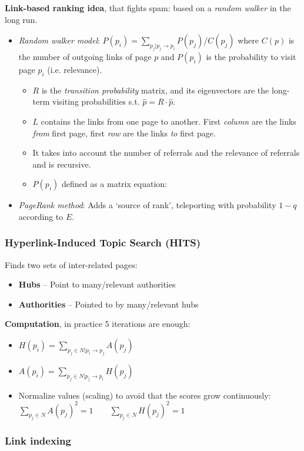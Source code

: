   \textbf{Link-based ranking idea}, that fights spam: based on a \emph{random walker} in the long run.
  \begin{itemize}
    \item \emph{Random walker model}: $P(p_i) = \sum_{p_j|p_j\rightarrow p_i}{P(p_j)/C(p_j)}$ where $C(p)$ is the number of outgoing links of page $p$ and $P(p_i)$ is the probability to visit page $p_i$ (i.e. relevance).
    \begin{itemize}
      \item $R$ is the \emph{transition probability} matrix, and its eigenvectors are the long-term visiting probabilities s.t. $\hat{p}=R\cdot \hat{p}$.
      \item $L$ contains the links from one page to another. First \emph{column} are the links \emph{from} first page, first \emph{row} are the links \emph{to} first page.
      \item It takes into account the number of referrals and the relevance of referrals and is recursive.
      \item $P(p_i)$ defined as a matrix equation: 
    \end{itemize}
    \item \emph{PageRank method}: Adds a `source of rank', teleporting with probability $1-q$ according to $E$. 
  \end{itemize}

\subsubsection{Hyperlink-Induced Topic Search (HITS)} %
\label{ssub:hyperlink_induced_topic_search_hits}
  Finds two sets of inter-related pages:
  \begin{itemize}
    \item \textbf{Hubs} -- Point to many/relevant authorities
    \item \textbf{Authorities} -- Pointed to by many/relevant hubs
  \end{itemize}

  \textbf{Computation}, in practice 5 iterations are enough:
  \begin{itemize}
    \item $H(p_i) = \sum_{p_j \in N | p_i\rightarrow p_j}{A(p_j)}$
    \item $A(p_i) = \sum_{p_j \in N | p_j\rightarrow p_i}{H(p_j)}$
    \item Normalize values (scaling) to avoid that the scores grow continuously:\\ $\sum_{p_j\in N}{A(p_j)^2}=1 \qquad \sum_{p_j\in N}{H(p_j)^2}=1$
  \end{itemize}


\subsubsection{Link indexing} %
\label{ssub:link_indexing}
